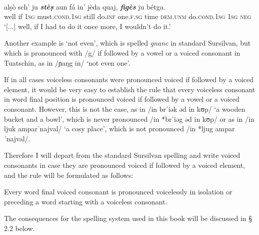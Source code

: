 \ea\label{ex:stes}
\\
\gll [...] alṣò sch' ju \textit{\textbf{stèṣ}} aun fá in' jèda quaj, \textit{\textbf{figès}} ju bétga.\\
{} well if \textsc{1sg} must.\textsc{cond.1sg} still do.\textsc{inf} one.\textsc{f.sg} time \textsc{dem.unm} do.\textsc{cond.1sg} \textsc{1sg} \textsc{neg}\\
\glt `[...] well, if I had to do it once more, I wouldn't do it.'
\z

Another example is `not even', which is spelled \textit{gnanc} in standard Sursilvan, but which is pronounced with /g/ if followed by a vowel or a voiced consonant in Tuatschin, as in /ɲaŋg in/ `not even one'.

If in all cases voiceless consonants were pronounced voiced if followed by a voiced element, it would be very easy to establish the rule that every voiceless consonant in word final position is pronounced voiced if followed by a vowel or a voiced consonant. However, this is not the case, as in /in brˈiək əd in kʊp/ `a wooden bucket and a bowl', which is never pronounced /in *brˈiəg əd in kʊp/ or as in /in ljuk amparˈnajval/ `a cosy place', which is not pronounced /in *ljug amparˈnajval/.

Therefore I will depart from the standard Sursilvan spelling and write voiced consonants in case they are pronounced voiced if followed by a voiced element, and the rule will be formulated as follows:

Every word final voiced consonant is pronounced voicelessly in isolation or preceding a word starting with a voiceless consonant.

The consequences for the spelling system used in this book will be discussed in § 2.2 below.

